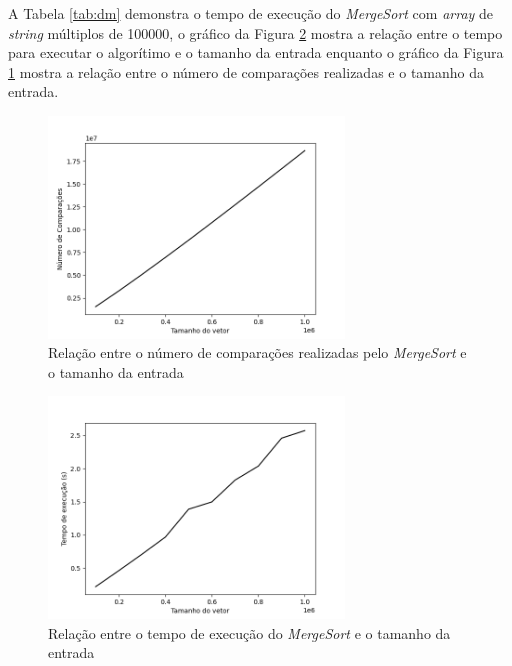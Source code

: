 \documentclass[12pt,a4paper,oneside]{article}
\begin{document}
\quad A Tabela \ref{tab:dm} demonstra o tempo de execução do \textit{MergeSort} com \textit{array} de \textit{string} múltiplos de 100000, o gráfico da Figura \ref{fig:tm} mostra a relação entre o tempo para executar o algorítimo e o tamanho da entrada enquanto o gráfico da Figura \ref{fig:nm} mostra a relação entre o número de comparações realizadas e o tamanho da entrada.

\begin{figure}[H]
\begin{center}
    \includegraphics[width=0.7\textwidth]{FigNM.png} 
\end{center}
\caption{Relação entre o número de comparações realizadas pelo \textit{MergeSort} e o tamanho da entrada}
\label{fig:nm}
\end{figure}

\begin{figure}[H]
\begin{center}
    \includegraphics[width=0.7\textwidth]{FigTM.png} 
\end{center}
\caption{Relação entre o tempo de execução do \textit{MergeSort} e o tamanho da entrada}
\label{fig:tm}
\end{figure}
\end{document}
